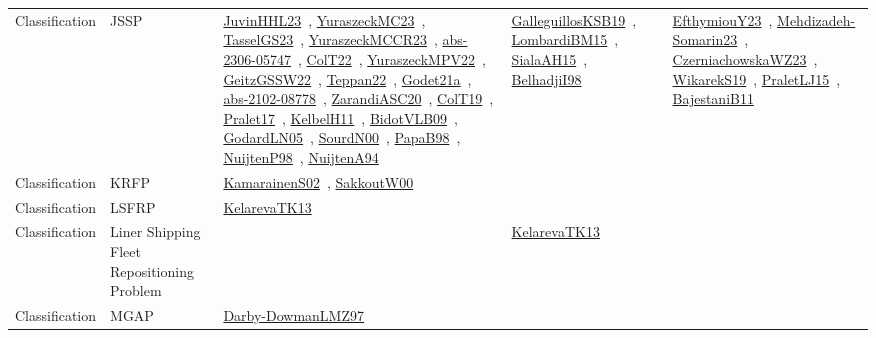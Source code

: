 {\begin{longtable}{lp{3cm}>{\raggedright\arraybackslash}p{6cm}>{\raggedright\arraybackslash}p{6cm}>{\raggedright\arraybackslash}p{8cm}}
Classification & JSSP & \href{works/JuvinHHL23.pdf}{JuvinHHL23}~\cite{JuvinHHL23}, \href{works/YuraszeckMC23.pdf}{YuraszeckMC23}~\cite{YuraszeckMC23}, \href{works/TasselGS23.pdf}{TasselGS23}~\cite{TasselGS23}, \href{works/YuraszeckMCCR23.pdf}{YuraszeckMCCR23}~\cite{YuraszeckMCCR23}, \href{works/abs-2306-05747.pdf}{abs-2306-05747}~\cite{abs-2306-05747}, \href{works/ColT22.pdf}{ColT22}~\cite{ColT22}, \href{works/YuraszeckMPV22.pdf}{YuraszeckMPV22}~\cite{YuraszeckMPV22}, \href{works/GeitzGSSW22.pdf}{GeitzGSSW22}~\cite{GeitzGSSW22}, \href{works/Teppan22.pdf}{Teppan22}~\cite{Teppan22}, \href{works/Godet21a.pdf}{Godet21a}~\cite{Godet21a}, \href{works/abs-2102-08778.pdf}{abs-2102-08778}~\cite{abs-2102-08778}, \href{works/ZarandiASC20.pdf}{ZarandiASC20}~\cite{ZarandiASC20}, \href{works/ColT19.pdf}{ColT19}~\cite{ColT19}, \href{works/Pralet17.pdf}{Pralet17}~\cite{Pralet17}, \href{works/KelbelH11.pdf}{KelbelH11}~\cite{KelbelH11}, \href{works/BidotVLB09.pdf}{BidotVLB09}~\cite{BidotVLB09}, \href{works/GodardLN05.pdf}{GodardLN05}~\cite{GodardLN05}, \href{works/SourdN00.pdf}{SourdN00}~\cite{SourdN00}, \href{works/PapaB98.pdf}{PapaB98}~\cite{PapaB98}, \href{works/NuijtenP98.pdf}{NuijtenP98}~\cite{NuijtenP98}, \href{works/NuijtenA94.pdf}{NuijtenA94}~\cite{NuijtenA94} & \href{works/GalleguillosKSB19.pdf}{GalleguillosKSB19}~\cite{GalleguillosKSB19}, \href{works/LombardiBM15.pdf}{LombardiBM15}~\cite{LombardiBM15}, \href{works/SialaAH15.pdf}{SialaAH15}~\cite{SialaAH15}, \href{works/BelhadjiI98.pdf}{BelhadjiI98}~\cite{BelhadjiI98} & \href{works/EfthymiouY23.pdf}{EfthymiouY23}~\cite{EfthymiouY23}, \href{works/Mehdizadeh-Somarin23.pdf}{Mehdizadeh-Somarin23}~\cite{Mehdizadeh-Somarin23}, \href{works/CzerniachowskaWZ23.pdf}{CzerniachowskaWZ23}~\cite{CzerniachowskaWZ23}, \href{works/WikarekS19.pdf}{WikarekS19}~\cite{WikarekS19}, \href{works/PraletLJ15.pdf}{PraletLJ15}~\cite{PraletLJ15}, \href{works/BajestaniB11.pdf}{BajestaniB11}~\cite{BajestaniB11}\\
Classification & KRFP & \href{works/KamarainenS02.pdf}{KamarainenS02}~\cite{KamarainenS02}, \href{works/SakkoutW00.pdf}{SakkoutW00}~\cite{SakkoutW00} &  & \\
Classification & LSFRP & \href{works/KelarevaTK13.pdf}{KelarevaTK13}~\cite{KelarevaTK13} &  & \\
Classification & Liner Shipping Fleet Repositioning Problem &  & \href{works/KelarevaTK13.pdf}{KelarevaTK13}~\cite{KelarevaTK13} & \\
Classification & MGAP & \href{works/Darby-DowmanLMZ97.pdf}{Darby-DowmanLMZ97}~\cite{Darby-DowmanLMZ97} &  & \\

\end{longtable}}
